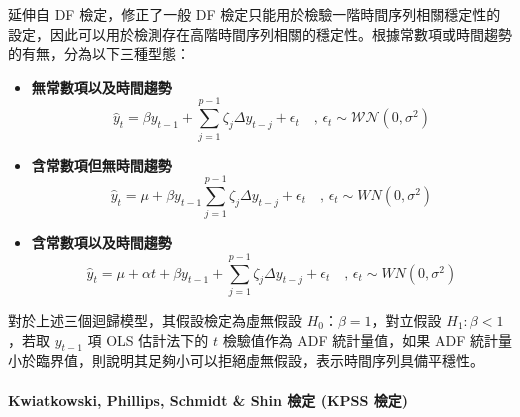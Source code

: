 延伸自 DF 檢定，修正了一般 DF 檢定只能用於檢驗一階時間序列相關穩定性的設定，因此可以用於檢測存在高階時間序列相關的穩定性。根據常數項或時間趨勢的有無，分為以下三種型態：
%
\begin{itemize}
  \item \textbf{無常數項以及時間趨勢} \\
        \begin{equation}
          \hat{y}_{t} = \beta y_{t - 1} + \sum_{j = 1}^{p - 1} \zeta_{j} \Delta y_{t - j} + \epsilon_{t} \quad \text{, } \epsilon_{t} \sim \mathcal{WN}(0, \sigma^2)
        \end{equation}
  \item \textbf{含常數項但無時間趨勢} \\
        \begin{equation}
          \hat{y}_{t} = \mu + \beta y_{t - 1} \sum_{j = 1}^{p - 1} \zeta_{j} \Delta y_{t - j} + \epsilon_{t} \quad \text{, } \epsilon_{t} \sim WN(0, \sigma^2)
        \end{equation}
  \item \textbf{含常數項以及時間趨勢} \\
        \begin{equation}
          \hat{y}_{t} = \mu + \alpha t + \beta y_{t - 1} + \sum_{j = 1}^{p - 1} \zeta_{j} \Delta y_{t - j} + \epsilon_{t} \quad \text{, } \epsilon_{t} \sim WN(0, \sigma^2)
        \end{equation}
\end{itemize}
%
對於上述三個迴歸模型，其假設檢定為虛無假設 $H_0$：$\beta = 1$，對立假設 $H_1: \beta < 1$，若取 $y_{t-1}$ 項 OLS 估計法下的 $t$ 檢驗值作為 ADF 統計量值，如果 ADF 統計量小於臨界值，則說明其足夠小可以拒絕虛無假設，表示時間序列具備平穩性。

\paragraph{Kwiatkowski, Phillips, Schmidt \& Shin 檢定 (KPSS 檢定)}

